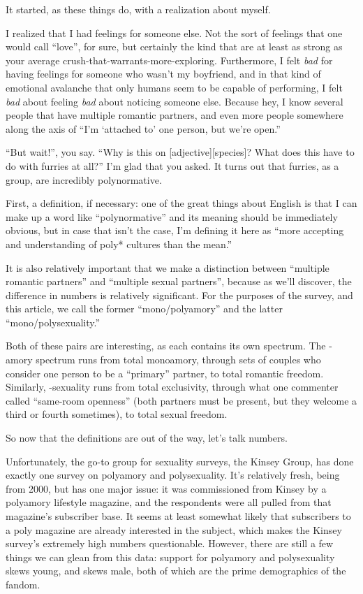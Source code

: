 
It started, as these things do, with a realization about myself.

I realized that I had feelings for someone else. Not the sort of feelings that one would call ``love'', for sure, but certainly the kind that are at least as strong as your average crush-that-warrants-more-exploring. Furthermore, I felt \textit{bad} for having feelings for someone who wasn't my boyfriend, and in that kind of emotional avalanche that only humans seem to be capable of performing, I felt \textit{bad} about feeling \textit{bad} about noticing someone else. Because hey, I know several people that have multiple romantic partners, and even more people somewhere along the axis of ``I'm `attached to' one person, but we're open.''

``But wait!'', you say. ``Why is this on [adjective][species]? What does this have to do with furries at all?'' I'm glad that you asked. It turns out that furries, as a group, are incredibly polynormative.

First, a definition, if necessary: one of the great things about English is that I can make up a word like ``polynormative'' and its meaning should be immediately obvious, but in case that isn't the case, I'm defining it here as ``more accepting and understanding of poly* cultures than the mean.''

It is also relatively important that we make a distinction between ``multiple romantic partners'' and ``multiple sexual partners'', because as we'll discover, the difference in numbers is relatively significant. For the purposes of the survey, and this article, we call the former ``mono/polyamory'' and the latter ``mono/polysexuality.''

Both of these pairs are interesting, as each contains its own spectrum. The -amory spectrum runs from total monoamory, through sets of couples who consider one person to be a ``primary'' partner, to total romantic freedom. Similarly, -sexuality runs from total exclusivity, through what one commenter called ``same-room openness'' (both partners must be present, but they welcome a third or fourth sometimes), to total sexual freedom.

So now that the definitions are out of the way, let's talk numbers.

Unfortunately, the go-to group for sexuality surveys, the Kinsey Group, has done exactly one survey on polyamory and polysexuality. It's relatively fresh, being from 2000, but has one major issue: it was commissioned from Kinsey by a polyamory lifestyle magazine, and the respondents were all pulled from that magazine's subscriber base. It seems at least somewhat likely that subscribers to a poly magazine are already interested in the subject, which makes the Kinsey survey's extremely high numbers questionable. However, there are still a few things we can glean from this data: support for polyamory and polysexuality skews young, and skews male, both of which are the prime demographics of the fandom.

